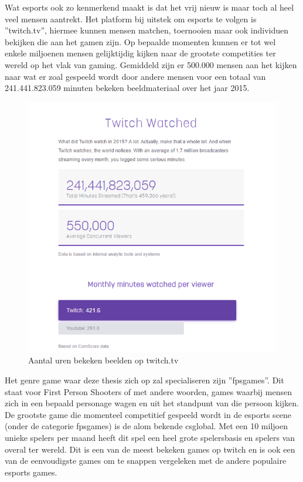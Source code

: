 \documentclass[pdftex,a4paper,12pt,twoside]{report}
\begin{document}
Wat \gls{esports} ook zo kenmerkend maakt is dat het vrij nieuw is maar toch al heel veel mensen aantrekt. Het platform bij uitstek om \gls{esports} te volgen is ''\gls{twitch}.tv'', hiermee kunnen mensen matchen, toernooien maar ook individuen bekijken die aan het gamen zijn. Op bepaalde momenten kunnen er tot wel enkele miljoenen mensen gelijktijdig kijken naar de grootste competities ter wereld op het vlak van gaming. Gemiddeld zijn er 500.000 mensen aan het kijken naar wat er zoal gespeeld wordt door andere mensen voor een totaal van 241.441.823.059 minuten bekeken beeldmateriaal over het jaar 2015. \citep{twitchinfographic}
\newpage

\begin{figure}[H]
\centering
\includegraphics[width=14cm]{img/TwitchInfographic}
\caption{Aantal uren bekeken beelden op \gls{twitch}.tv}
\end{figure}  


Het genre game waar deze thesis zich op zal specialiseren zijn ''\gls{fpsgames}''. Dit staat voor First Person Shooters of met andere woorden, games waarbij mensen zich in een bepaald personage wagen en uit het standpunt van die persoon kijken. De grootste game die momenteel competitief gespeeld wordt in de \gls{esports} scene (onder de categorie \gls{fpsgames}) is de alom bekende \gls{csglobal}. 
 Met een 10 miljoen unieke spelers per maand heeft dit spel een heel grote spelersbasis en spelers van overal ter wereld. Dit is een van de meest bekeken games op \gls{twitch} en is ook een van de eenvoudigste games om te snappen vergeleken met de andere populaire \gls{esports} games. \citep{csgoblog}
\\
\end{document}
